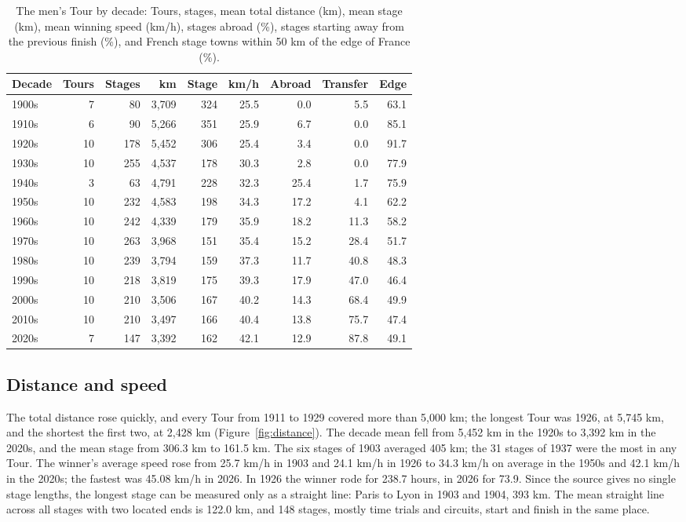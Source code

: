 \documentclass[11pt,a4paper]{article}
\begin{document}
\begin{table}[tbp]\centering\small\setlength{\tabcolsep}{5pt}\caption{The men's Tour by decade: Tours, stages, mean total distance (km), mean stage (km), mean winning speed (km/h), stages abroad (\%), stages starting away from the previous finish (\%), and French stage towns within 50 km of the edge of France (\%).}\label{tab:decades}\begin{tabular}{lrrrrrrrr}\toprule Decade & Tours & Stages & km & Stage & km/h & Abroad & Transfer & Edge\\\midrule
1900s & 7 & 80 & 3,709 & 324 & 25.5 & 0.0 & 5.5 & 63.1\\
1910s & 6 & 90 & 5,266 & 351 & 25.9 & 6.7 & 0.0 & 85.1\\
1920s & 10 & 178 & 5,452 & 306 & 25.4 & 3.4 & 0.0 & 91.7\\
1930s & 10 & 255 & 4,537 & 178 & 30.3 & 2.8 & 0.0 & 77.9\\
1940s & 3 & 63 & 4,791 & 228 & 32.3 & 25.4 & 1.7 & 75.9\\
1950s & 10 & 232 & 4,583 & 198 & 34.3 & 17.2 & 4.1 & 62.2\\
1960s & 10 & 242 & 4,339 & 179 & 35.9 & 18.2 & 11.3 & 58.2\\
1970s & 10 & 263 & 3,968 & 151 & 35.4 & 15.2 & 28.4 & 51.7\\
1980s & 10 & 239 & 3,794 & 159 & 37.3 & 11.7 & 40.8 & 48.3\\
1990s & 10 & 218 & 3,819 & 175 & 39.3 & 17.9 & 47.0 & 46.4\\
2000s & 10 & 210 & 3,506 & 167 & 40.2 & 14.3 & 68.4 & 49.9\\
2010s & 10 & 210 & 3,497 & 166 & 40.4 & 13.8 & 75.7 & 47.4\\
2020s & 7 & 147 & 3,392 & 162 & 42.1 & 12.9 & 87.8 & 49.1\\
\bottomrule\end{tabular}\end{table}

\subsection{Distance and speed}
The total distance rose quickly, and every Tour from 1911 to 1929 covered more than 5,000 km; the longest Tour was 1926, at 5,745 km, and the shortest the first two, at 2,428 km (Figure~\ref{fig:distance}). The decade mean fell from 5,452 km in the 1920s to 3,392 km in the 2020s, and the mean stage from 306.3 km to 161.5 km. The six stages of 1903 averaged 405 km; the 31 stages of 1937 were the most in any Tour. The winner's average speed rose from 25.7 km/h in 1903 and 24.1 km/h in 1926 to 34.3 km/h on average in the 1950s and 42.1 km/h in the 2020s; the fastest was 45.08 km/h in 2026. In 1926 the winner rode for 238.7 hours, in 2026 for 73.9. Since the source gives no single stage lengths, the longest stage can be measured only as a straight line: Paris to Lyon in 1903 and 1904, 393 km. The mean straight line across all stages with two located ends is 122.0 km, and 148 stages, mostly time trials and circuits, start and finish in the same place.
\end{document}
